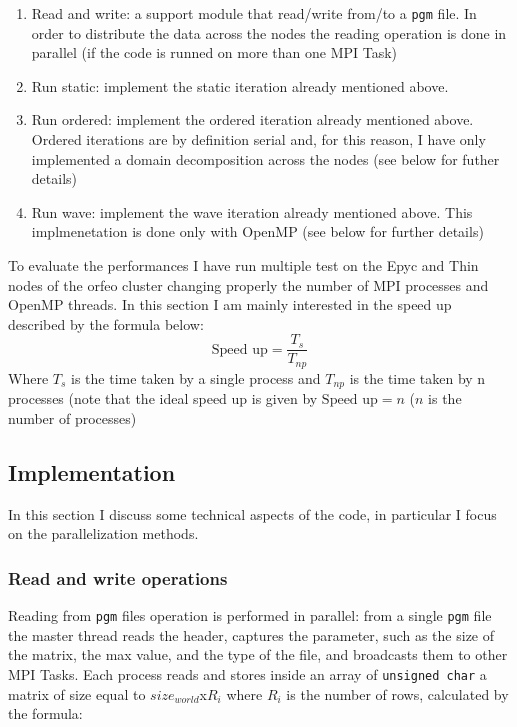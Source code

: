 \documentclass[
  letterpaper,
  DIV=11,
  numbers=noendperiod]{scrartcl}
\providecommand{\tightlist}{%
  \setlength{\itemsep}{0pt}\setlength{\parskip}{0pt}}\usepackage{longtable,booktabs,array}
\begin{document}
\begin{enumerate}
\tightlist
\item
  Read and write: a support module that read/write from/to a
  \texttt{pgm} file. In order to distribute the data across the nodes
  the reading operation is done in parallel (if the code is runned on
  more than one MPI Task)
\item
  Run static: implement the static iteration already mentioned above.
\item
  Run ordered: implement the ordered iteration already mentioned above.
  Ordered iterations are by definition serial and, for this reason, I
  have only implemented a domain decomposition across the nodes (see
  below for futher details)
\item
  Run wave: implement the wave iteration already mentioned above. This
  implmenetation is done only with OpenMP (see below for further
  details)
\end{enumerate}

To evaluate the performances I have run multiple test on the Epyc and
Thin nodes of the orfeo cluster changing properly the number of MPI
processes and OpenMP threads. In this section I am mainly interested in
the speed up described by the formula below: \[
    \text{Speed up} = \frac{T_s}{T_{np}}
\] Where \(T_s\) is the time taken by a single process and \(T_{np}\) is
the time taken by n processes (note that the ideal speed up is given by
\(\text{Speed up} = n\) (\(n\) is the number of processes)

\hypertarget{implementation}{%
\subsection{Implementation}\label{implementation}}

In this section I discuss some technical aspects of the code, in
particular I focus on the parallelization methods.

\hypertarget{read-and-write-operations}{%
\subsubsection{Read and write
operations}\label{read-and-write-operations}}

Reading from \texttt{pgm} files operation is performed in parallel: from
a single \texttt{pgm} file the master thread reads the header, captures
the parameter, such as the size of the matrix, the max value, and the
type of the file, and broadcasts them to other MPI Tasks. Each process
reads and stores inside an array of \texttt{unsigned\ char} a matrix of
size equal to \(size_{world}\)x\(R_i\) where \(R_i\) is the number of
rows, calculated by the formula:
\end{document}

